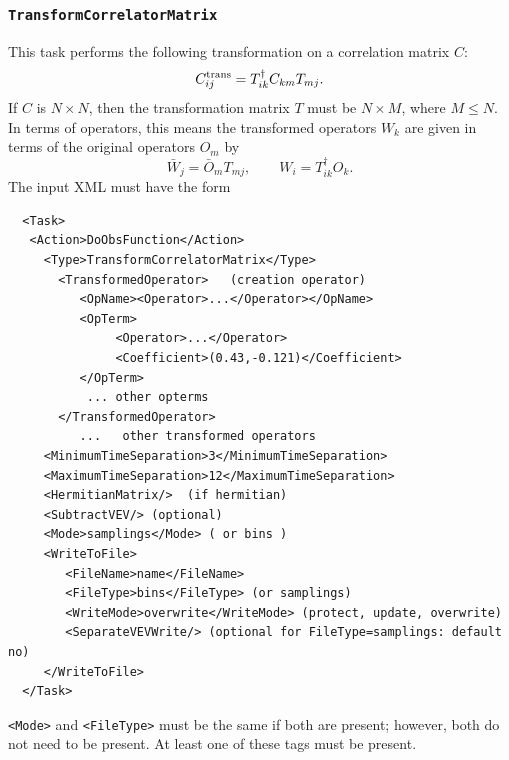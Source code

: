 \documentclass[12pt]{article}
\newcommand{\vb}{\texttt}
\begin{document}
\subsubsection{\vb{TransformCorrelatorMatrix}}
This task performs the following transformation on a correlation matrix $C$:
\[
  C^{\rm trans}_{ij} = T^\dagger_{ik} C_{km} T_{mj}.
\]
If $C$ is $N\times N$, then the transformation matrix $T$ must be 
$N\times M$, where $M \leq N$.  In terms of operators, this means the 
transformed operators $W_k$ are given in terms of the original operators
$O_m$ by
\[   \bar{W}_j = \bar{O}_m T_{mj},\qquad 
                   W_i = T^\dagger_{ik} O_k.
\]
The input XML must have the form
\begin{verbatim}
  <Task>
   <Action>DoObsFunction</Action>
     <Type>TransformCorrelatorMatrix</Type>              
       <TransformedOperator>   (creation operator)       
          <OpName><Operator>...</Operator></OpName>      
          <OpTerm>                                       
               <Operator>...</Operator>                  
               <Coefficient>(0.43,-0.121)</Coefficient>  
          </OpTerm>                                      
           ... other opterms                             
       </TransformedOperator>                            
          ...   other transformed operators              
     <MinimumTimeSeparation>3</MinimumTimeSeparation>    
     <MaximumTimeSeparation>12</MaximumTimeSeparation>   
     <HermitianMatrix/>  (if hermitian)                  
     <SubtractVEV/> (optional)                           
     <Mode>samplings</Mode> ( or bins )
     <WriteToFile>                                       
        <FileName>name</FileName>                        
        <FileType>bins</FileType> (or samplings)         
        <WriteMode>overwrite</WriteMode> (protect, update, overwrite)    
        <SeparateVEVWrite/> (optional for FileType=samplings: default no)
     </WriteToFile> 
  </Task>
\end{verbatim}
\vb{<Mode>} and \vb{<FileType>} must be the same if both are present;
however, both do not need to be present.  At least one of these tags must 
be present.
\end{document}
